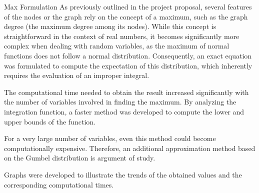 \begin{projsection}{Max Formulation}
	As previously outlined in the project proposal, several features of the nodes or the graph rely on the concept of a maximum, such as the graph degree (the maximum degree among its nodes). While this concept is straightforward in the context of real numbers, it becomes significantly more complex when dealing with random variables, as the maximum of normal functions does not follow a normal distribution. Consequently, an exact equation was formulated to compute the expectation of this distribution, which inherently requires the evaluation of an improper integral.
	
	The computational time needed to obtain the result increased significantly with the number of variables involved in finding the maximum. By analyzing the integration function, a faster method was developed to compute the lower and upper bounds of the function.
	
	For a very large number of variables, even this method could become computationally expensive. Therefore, an additional approximation method based on the Gumbel distribution is argument of study.
	
	Graphs were developed to illustrate the trends of the obtained values and the corresponding computational times.
	
\end{projsection}

	
